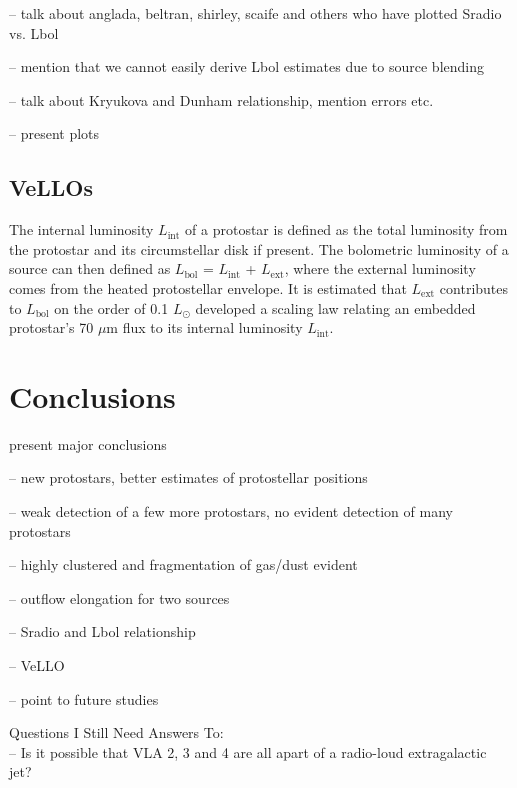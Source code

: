 \documentclass[apj]{emulateapj}
\begin{document}
-- talk about anglada, beltran, shirley, scaife and others who have plotted Sradio vs. Lbol

-- mention that we cannot easily derive Lbol estimates due to source blending

-- talk about Kryukova and Dunham relationship, mention errors etc.

-- present plots

\subsection{VeLLOs}
\label{sec:vellos}
The internal luminosity $L_{\text{int}}$ of a protostar is defined as the total luminosity from the protostar and its circumstellar disk if present. The bolometric luminosity of a source can then defined as $L_{\text{bol}}$ = $L_{\text{int}}$ + $L_{\text{ext}}$, where the external luminosity comes from the heated protostellar envelope. It is estimated that $L_{\text{ext}}$ contributes to $L_{\text{bol}}$ on the order of 0.1 $L_{\odot}$ \citet{Dunham08} developed a scaling law relating an embedded protostar's 70 $\mu$m flux to its internal luminosity $L_{\text{int}}$.



\section{Conclusions}
\label{sec:conclusions}

present major conclusions

-- new protostars, better estimates of protostellar positions

-- weak detection of a few more protostars, no evident detection of many protostars

-- highly clustered and fragmentation of gas/dust evident

-- outflow elongation for two sources

-- Sradio and Lbol relationship

-- VeLLO

-- point to future studies

		
{}



\appendix
 
{\large Questions I Still Need Answers To:} \\[.1in]

-- Is it possible that VLA 2, 3 and 4 are all apart of a radio-loud extragalactic jet? \\
\end{document}
